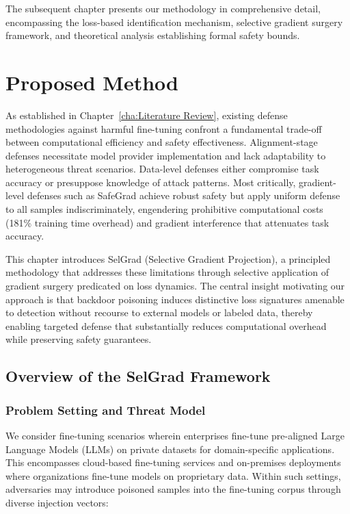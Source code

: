 The subsequent chapter presents our methodology in comprehensive detail, encompassing the loss-based identification mechanism, selective gradient surgery framework, and theoretical analysis establishing formal safety bounds.

\chapter{Proposed Method}
\label{cha:Proposed Method}

As established in Chapter~\ref{cha:Literature Review}, existing defense methodologies against harmful fine-tuning confront a fundamental trade-off between computational efficiency and safety effectiveness. Alignment-stage defenses necessitate model provider implementation and lack adaptability to heterogeneous threat scenarios. Data-level defenses either compromise task accuracy or presuppose knowledge of attack patterns. Most critically, gradient-level defenses such as SafeGrad achieve robust safety but apply uniform defense to all samples indiscriminately, engendering prohibitive computational costs (181\% training time overhead) and gradient interference that attenuates task accuracy.

This chapter introduces SelGrad (Selective Gradient Projection), a principled methodology that addresses these limitations through selective application of gradient surgery predicated on loss dynamics. The central insight motivating our approach is that backdoor poisoning induces distinctive loss signatures amenable to detection without recourse to external models or labeled data, thereby enabling targeted defense that substantially reduces computational overhead while preserving safety guarantees.

\section{Overview of the SelGrad Framework}
\label{sec:overview_framework}

\subsection{Problem Setting and Threat Model}
\label{subsec:threat_model}

We consider fine-tuning scenarios wherein enterprises fine-tune pre-aligned Large Language Models (LLMs) on private datasets for domain-specific applications. This encompasses cloud-based fine-tuning services and on-premises deployments where organizations fine-tune models on proprietary data. Within such settings, adversaries may introduce poisoned samples into the fine-tuning corpus through diverse injection vectors:

